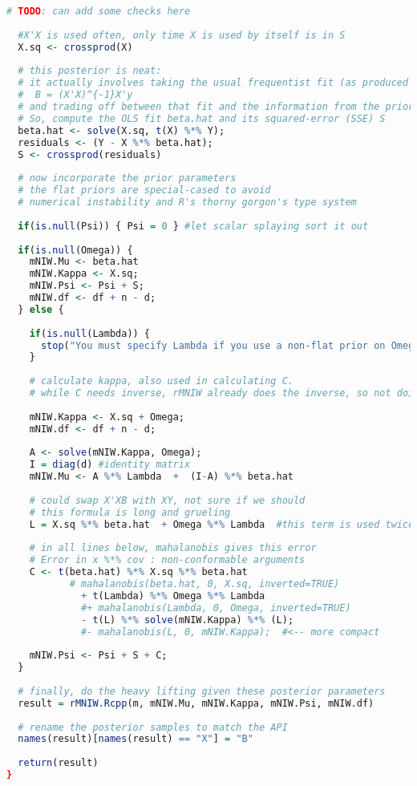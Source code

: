 \documentclass[english]{report}
\begin{document}
\begin{lstlisting}[frame=single, language=R]
  # TODO: can add some checks here
  
  #X'X is used often, only time X is used by itself is in S
  X.sq <- crossprod(X)
  
  # this posterior is neat:
  # it actually involves taking the usual frequentist fit (as produced by lm())
  #  B = (X'X)^{-1}X'y
  # and trading off between that fit and the information from the prior.
  # So, compute the OLS fit beta.hat and its squared-error (SSE) S 
  beta.hat <- solve(X.sq, t(X) %*% Y);
  residuals <- (Y - X %*% beta.hat);
  S <- crossprod(residuals)
  
  # now incorporate the prior parameters
  # the flat priors are special-cased to avoid
  # numerical instability and R's thorny gorgon's type system
  
  if(is.null(Psi)) { Psi = 0 } #let scalar splaying sort it out
  
  if(is.null(Omega)) {
    mNIW.Mu <- beta.hat
    mNIW.Kappa <- X.sq;
    mNIW.Psi <- Psi + S;
    mNIW.df <- df + n - d;
  } else {
    
    if(is.null(Lambda)) {
      stop("You must specify Lambda if you use a non-flat prior on Omega");
    }
    
    # calculate kappa, also used in calculating C.
    # while C needs inverse, rMNIW already does the inverse, so not doing it here
    
    mNIW.Kappa <- X.sq + Omega;
    mNIW.df <- df + n - d;
    
    A <- solve(mNIW.Kappa, Omega);    
    I = diag(d) #identity matrix
    mNIW.Mu <- A %*% Lambda  +  (I-A) %*% beta.hat
    
    # could swap X'XB with XY, not sure if we should
    # this formula is long and grueling
    L = X.sq %*% beta.hat  + Omega %*% Lambda  #this term is used twice
    
    # in all lines below, mahalanobis gives this error 
    # Error in x %*% cov : non-conformable arguments
    C <- t(beta.hat) %*% X.sq %*% beta.hat
           # mahalanobis(beta.hat, 0, X.sq, inverted=TRUE)
             + t(Lambda) %*% Omega %*% Lambda
             #+ mahalanobis(Lambda, 0, Omega, inverted=TRUE) 
             - t(L) %*% solve(mNIW.Kappa) %*% (L);
             #- mahalanobis(L, 0, mNIW.Kappa);  #<-- more compact
             
    mNIW.Psi <- Psi + S + C;
  }
  
  # finally, do the heavy lifting given these posterior parameters
  result = rMNIW.Rcpp(m, mNIW.Mu, mNIW.Kappa, mNIW.Psi, mNIW.df)
  
  # rename the posterior samples to match the API
  names(result)[names(result) == "X"] = "B" 
  
  return(result)
}

\end{lstlisting}
\end{document}
